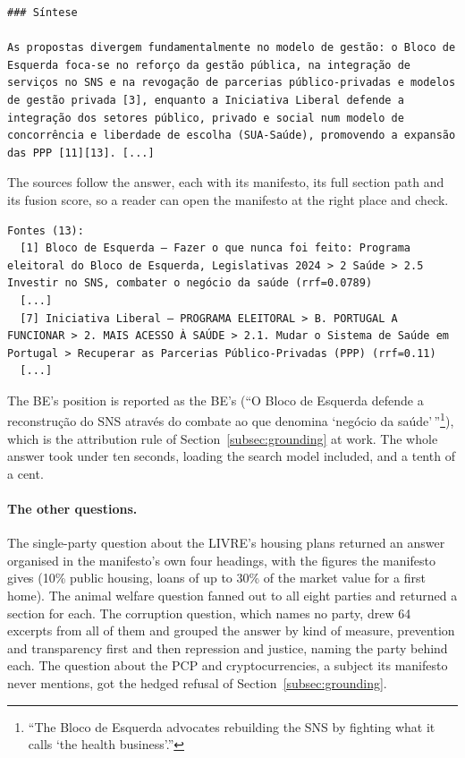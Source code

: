 \begin{Verbatim}[fontsize=\scriptsize, breaklines=true, frame=single]
### Síntese

As propostas divergem fundamentalmente no modelo de gestão: o Bloco de Esquerda foca-se no reforço da gestão pública, na integração de serviços no SNS e na revogação de parcerias público-privadas e modelos de gestão privada [3], enquanto a Iniciativa Liberal defende a integração dos setores público, privado e social num modelo de concorrência e liberdade de escolha (SUA-Saúde), promovendo a expansão das PPP [11][13]. [...]
\end{Verbatim}

The sources follow the answer, each with its manifesto, its full section path
and its fusion score, so a reader can open the manifesto at the right place
and check.

\begin{Verbatim}[fontsize=\scriptsize, breaklines=true, frame=single]
Fontes (13):
  [1] Bloco de Esquerda – Fazer o que nunca foi feito: Programa eleitoral do Bloco de Esquerda, Legislativas 2024 > 2 Saúde > 2.5 Investir no SNS, combater o negócio da saúde (rrf=0.0789)
  [...]
  [7] Iniciativa Liberal – PROGRAMA ELEITORAL > B. PORTUGAL A FUNCIONAR > 2. MAIS ACESSO À SAÚDE > 2.1. Mudar o Sistema de Saúde em Portugal > Recuperar as Parcerias Público-Privadas (PPP) (rrf=0.11)
  [...]
\end{Verbatim}

The BE's position is reported as the BE's (``O Bloco de Esquerda defende a
reconstrução do SNS através do combate ao que denomina `negócio da
saúde'\,''\footnote{``The Bloco de Esquerda advocates rebuilding the SNS by
fighting what it calls `the health business'.''}), which is the attribution
rule of Section~\ref{subsec:grounding} at work. The whole answer took under
ten seconds, loading the search model included, and a tenth of a cent.

\paragraph{The other questions.} The single-party question about the LIVRE's
housing plans returned an answer organised in the manifesto's own four
headings, with the figures the manifesto gives (10\% public housing, loans of up
to 30\% of the market value for a first home). The animal welfare question fanned out to all
eight parties and returned a section for each. The corruption question, which
names no party, drew 64 excerpts from all of them and grouped the answer by
kind of measure, prevention and transparency first and then repression and
justice, naming the party behind each. The question about the PCP and
cryptocurrencies, a subject its manifesto never mentions, got the hedged
refusal of Section~\ref{subsec:grounding}.

